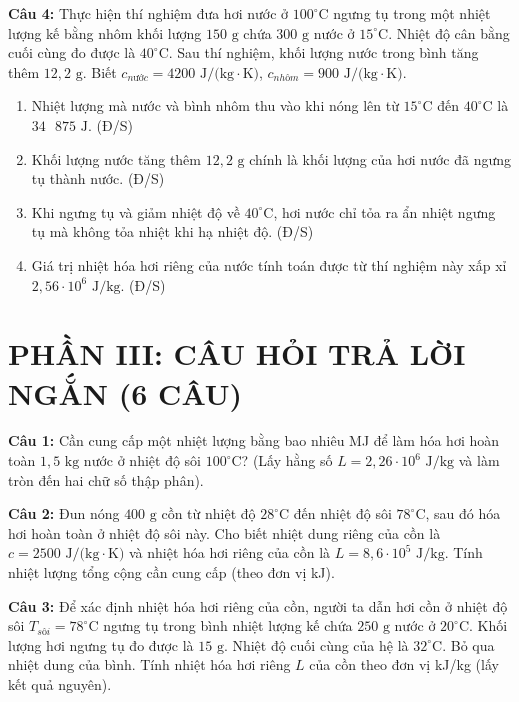 \documentclass[12pt,a4paper]{article}
\begin{document}
\textbf{Câu 4:} Thực hiện thí nghiệm đưa hơi nước ở $100^{\circ}\text{C}$ ngưng tụ trong một nhiệt lượng kế bằng nhôm khối lượng $150\text{ g}$ chứa $300\text{ g}$ nước ở $15^{\circ}\text{C}$. Nhiệt độ cân bằng cuối cùng đo được là $40^{\circ}\text{C}$. Sau thí nghiệm, khối lượng nước trong bình tăng thêm $12{,}2\text{ g}$. Biết $c_{nước} = 4200\text{ J/(kg}\cdot\text{K)}$, $c_{nhôm} = 900\text{ J/(kg}\cdot\text{K)}$.
\begin{enumerate}[label=\alph*.]
  \item Nhiệt lượng mà nước và bình nhôm thu vào khi nóng lên từ $15^{\circ}\text{C}$ đến $40^{\circ}\text{C}$ là $34\text{ }875\text{ J}$. \hfill (Đ/S)
  \item Khối lượng nước tăng thêm $12{,}2\text{ g}$ chính là khối lượng của hơi nước đã ngưng tụ thành nước. \hfill (Đ/S)
  \item Khi ngưng tụ và giảm nhiệt độ về $40^{\circ}\text{C}$, hơi nước chỉ tỏa ra ẩn nhiệt ngưng tụ mà không tỏa nhiệt khi hạ nhiệt độ. \hfill (Đ/S)
  \item Giá trị nhiệt hóa hơi riêng của nước tính toán được từ thí nghiệm này xấp xỉ $2{,}56 \cdot 10^6\text{ J/kg}$. \hfill (Đ/S)
\end{enumerate}


\section*{PHẦN III: CÂU HỎI TRẢ LỜI NGẮN (6 CÂU)}

\textbf{Câu 1:} Cần cung cấp một nhiệt lượng bằng bao nhiêu MJ để làm hóa hơi hoàn toàn $1{,}5\text{ kg}$ nước ở nhiệt độ sôi $100^{\circ}\text{C}$? (Lấy hằng số $L = 2{,}26 \cdot 10^6\text{ J/kg}$ và làm tròn đến hai chữ số thập phân).
\hrulefill

\textbf{Câu 2:} Đun nóng $400\text{ g}$ cồn từ nhiệt độ $28^{\circ}\text{C}$ đến nhiệt độ sôi $78^{\circ}\text{C}$, sau đó hóa hơi hoàn toàn ở nhiệt độ sôi này. Cho biết nhiệt dung riêng của cồn là $c = 2500\text{ J/(kg}\cdot\text{K)}$ và nhiệt hóa hơi riêng của cồn là $L = 8{,}6 \cdot 10^5\text{ J/kg}$. Tính nhiệt lượng tổng cộng cần cung cấp (theo đơn vị kJ).
\hrulefill

\textbf{Câu 3:} Để xác định nhiệt hóa hơi riêng của cồn, người ta dẫn hơi cồn ở nhiệt độ sôi $T_{sôi} = 78^{\circ}\text{C}$ ngưng tụ trong bình nhiệt lượng kế chứa $250\text{ g}$ nước ở $20^{\circ}\text{C}$. Khối lượng hơi ngưng tụ đo được là $15\text{ g}$. Nhiệt độ cuối cùng của hệ là $32^{\circ}\text{C}$. Bỏ qua nhiệt dung của bình. Tính nhiệt hóa hơi riêng $L$ của cồn theo đơn vị kJ/kg (lấy kết quả nguyên).
\hrulefill
\end{document}
